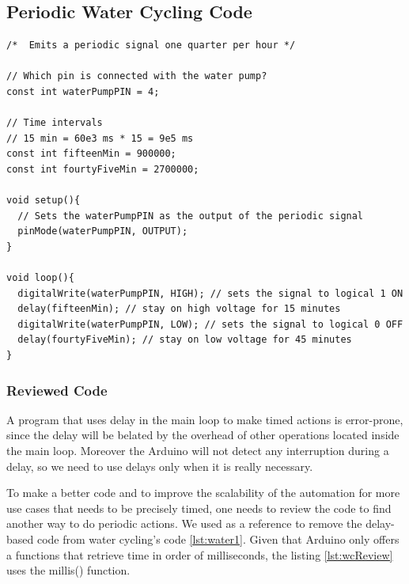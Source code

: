 \subsection{Periodic Water Cycling Code}


\begin{lstlisting}[style=Arduino, caption=Water Cycle First Code, label=lst:water1]
 /*  Emits a periodic signal one quarter per hour */

// Which pin is connected with the water pump?
const int waterPumpPIN = 4;

// Time intervals
// 15 min = 60e3 ms * 15 = 9e5 ms
const int fifteenMin = 900000;
const int fourtyFiveMin = 2700000;

void setup(){
  // Sets the waterPumpPIN as the output of the periodic signal
  pinMode(waterPumpPIN, OUTPUT);
}

void loop(){
  digitalWrite(waterPumpPIN, HIGH); // sets the signal to logical 1 ON
  delay(fifteenMin); // stay on high voltage for 15 minutes
  digitalWrite(waterPumpPIN, LOW); // sets the signal to logical 0 OFF
  delay(fourtyFiveMin); // stay on low voltage for 45 minutes
}
\end{lstlisting}

\subsubsection{Reviewed Code}
A program that uses delay in the main loop to make timed actions is error-prone,
since the delay will be belated by the overhead of other operations located inside the main loop.
Moreover the Arduino will not detect any interruption during a delay,
so we need to use delays only when it is really necessary.

To make a better code and to improve the scalability of the automation for more use cases that needs to be precisely timed,
one needs to review the code to find another way to do periodic actions.
We used \cite{arduinoDelay} as a reference to remove the delay-based code from water cycling's code \ref{lst:water1}.
Given that Arduino only offers a functions that retrieve time in order of milliseconds,
the listing \ref{lst:wcReview} uses the millis() function.

